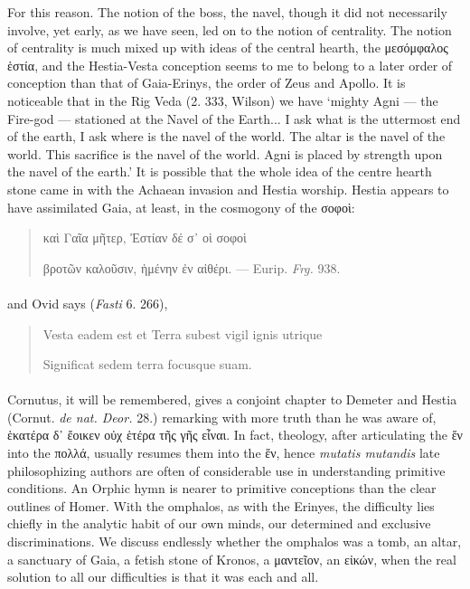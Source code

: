 \documentclass[a4paper, 11pt, oneside, polutonikogreek, english]{article}
\begin{document}
For this reason. The notion of the boss, the navel, though it did not necessarily involve, yet early, as we have seen, led on to the notion of centrality. The notion of centrality is much mixed up with ideas of the central hearth, the μεσόμφαλος ἑστία, and the Hestia-Vesta conception seems to me to belong to a later order of conception than that of Gaia-Erinys, the order of Zeus and Apollo. It is noticeable that in the Rig Veda (2. 333, Wilson) we have `mighty Agni --- the Fire-god --- stationed at the Navel of the Earth... I ask what is the uttermost end of the earth, I ask where is the navel of the world. The altar is the navel of the world. This sacrifice is the navel of the world. Agni is placed by strength upon the navel of the earth.' It is possible that the whole idea of the centre hearth stone came in with the Achaean invasion and Hestia worship. Hestia appears to have assimilated Gaia, at least, in the cosmogony of the σοφοὶ:
\begin{quotation}
καὶ Γαῖα μῆτερ, Ἐστίαν δέ σ᾽ οἱ σοφοὶ

βροτῶν καλοῦσιν, ἡμένην ἐν αἰθέρι. --- Eurip. \emph{Frg.} 938.
\end{quotation}
\paragraph{}
and Ovid says (\emph{Fasti} 6. 266),
\begin{quotation}
Vesta eadem est et Terra subest vigil ignis utrique

Significat sedem terra focusque suam.
\end{quotation}
\paragraph{}
Cornutus, it will be remembered, gives a conjoint chapter to Demeter and Hestia (Cornut. \emph{de nat. Deor.} 28.) remarking with more truth than he was aware of, ἑκατέρα δ᾽ ἔοικεν οὐχ ἑτέρα τῆς γῆς εἶναι. In fact, theology, after articulating the ἕν into the πολλά, usually resumes them into the ἕν, hence \emph{mutatis mutandis} late philosophizing authors are often of considerable use in understanding primitive conditions. An Orphic hymn is nearer to primitive conceptions than the clear outlines of Homer. With the omphalos, as with the Erinyes, the difficulty lies chiefly in the analytic habit of our own minds, our determined and exclusive discriminations. We discuss endlessly whether the omphalos was a tomb, an altar, a sanctuary of Gaia, a fetish stone of Kronos, a μαντεῖον, an εἰκών, when the real solution to all our difficulties is that it was each and all.
\end{document}
